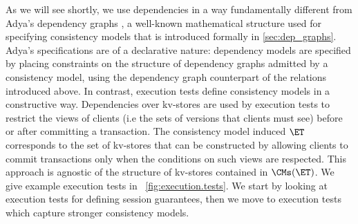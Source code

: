 As we will see shortly, we use dependencies in a way fundamentally 
different from Adya's dependency graphs \cite{adya}, 
a well-known mathematical structure used for specifying consistency models that is introduced 
formally in \cref{sec:dep_graphs}.
Adya's specifications are of a declarative nature: dependency models are specified by 
placing constraints on the structure of dependency graphs admitted by a consistency model, using the dependency graph counterpart 
of the relations introduced above. 
In contrast, execution tests define consistency models in a constructive way. Dependencies 
over kv-stores are used by execution tests to restrict the views of clients (i.e the sets of versions that clients must see) before or 
after committing a transaction. The consistency model induced $\ET$ corresponds 
to the set of kv-stores that can be constructed by allowing clients to commit transactions only 
when the conditions on such views are respected. This approach is agnostic of the structure 
of kv-stores contained in $\CMs(\ET)$.
%
We give example execution tests in
~\cref{fig:execution.tests}. 
We start by looking at  execution tests for defining  session
guarantees, then we move to execution tests which capture stronger
consistency models. 


